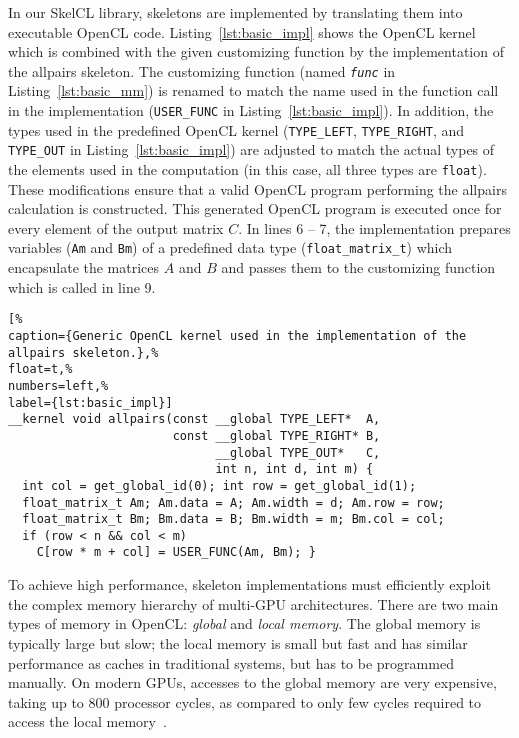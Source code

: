 In our SkelCL library, skeletons are implemented by translating them into executable OpenCL code.
Listing~\ref{lst:basic_impl} shows the OpenCL kernel which is combined with the given customizing function by the implementation of the allpairs skeleton.
The customizing function (named \texttt{\emph{func}} in Listing~\ref{lst:basic_mm}) is renamed to match the name used in the function call in the implementation (\texttt{USER\_FUNC} in Listing~\ref{lst:basic_impl}).
In addition, the types used in the predefined OpenCL kernel (\texttt{TYPE\_LEFT}, \texttt{TYPE\_RIGHT}, and \texttt{TYPE\_OUT} in Listing~\ref{lst:basic_impl}) are adjusted to match the actual types of the elements used in the computation (in this case, all three types are \texttt{float}).
These modifications ensure that a valid OpenCL program performing the allpairs calculation is constructed.
This generated OpenCL program is executed once for every element of the output matrix $C$.
In lines 6 -- 7, the implementation prepares variables (\texttt{Am} and \texttt{Bm}) of a predefined data type (\texttt{float\_matrix\_t}) which encapsulate the matrices $A$ and $B$ and passes them to the customizing function which is called in line 9.

\begin{lstlisting}[%                                                             
caption={Generic OpenCL kernel used in the implementation of the allpairs skeleton.},%
float=t,%                                                                       
numbers=left,%
label={lst:basic_impl}]
__kernel void allpairs(const __global TYPE_LEFT*  A,
                       const __global TYPE_RIGHT* B,
                             __global TYPE_OUT*   C,
                             int n, int d, int m) {
  int col = get_global_id(0); int row = get_global_id(1);
  float_matrix_t Am; Am.data = A; Am.width = d; Am.row = row;
  float_matrix_t Bm; Bm.data = B; Bm.width = m; Bm.col = col;
  if (row < n && col < m)
    C[row * m + col] = USER_FUNC(Am, Bm); }
\end{lstlisting}

To achieve high performance, skeleton implementations must efficiently exploit the complex memory hierarchy of multi-GPU architectures.
There are two main types of memory in OpenCL: \emph{global} and \emph{local memory}.
The global memory is typically large but slow; the local memory is small but fast and has similar performance as caches in traditional systems, but has to be programmed manually.
On modern GPUs, accesses to the global memory are very expensive, taking up to 800 processor cycles, as compared to only few cycles required to access the local memory~\cite{NVIDIA-12}.

